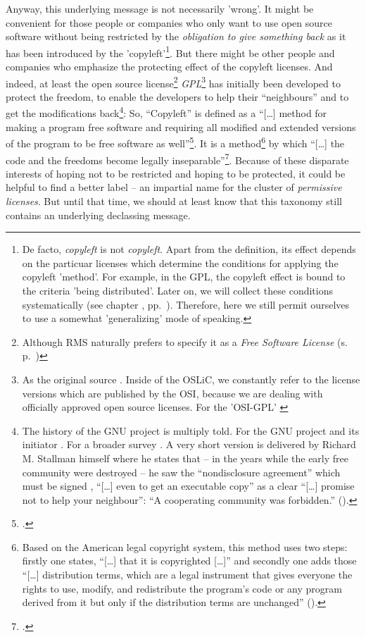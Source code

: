 Anyway, this underlying message is not necessarily 'wrong'. It might be
convenient for those people or companies who only want to use open source
software without being restricted by the \emph{obligation to give something
back} as it has been introduced by the 'copyleft'\footnote{De facto,
\emph{copyleft} is not \emph{copyleft}. Apart from the definition, its effect
depends on the par\-ti\-cu\-ar licenses which determine the conditions for
applying the copyleft 'method'. For example, in the GPL, the copyleft effect is
bound to the criteria 'being distributed'. Later on, we will collect these
conditions systematically (see chapter \emph{}, pp.\
\pageref{sec:OSUCdeduction}). Therefore, here we still permit ourselves to use a
somewhat 'generalizing' mode of speaking.}. But there might be other people and
companies who emphasize the protecting effect of the copyleft licenses. And
indeed, at least the open source license\footnote{Although RMS naturally prefers
to specify it as a \emph{Free Software License} (s. p.\ \pageref{RmsFsPriority})
} \emph{GPL}\footnote{As the original source \cite[cf.][\nopage
wp]{Gpl20FsfLicense1991a}. Inside of the OSLiC, we constantly refer to the
license versions which are published by the OSI, because we are dealing with
officially approved open source licenses. For the 'OSI-GPL' \cite[cf.][\nopage
wp]{Gpl20OsiLicense1991a}} has initially been developed to protect the freedom,
to enable the developers to help their \enquote{neighbours} and to get the
modifications back\footnote{The history of the GNU project is multiply told. For
the GNU project and its initiator \cite[cf.\ pars pro toto][\nopage
passim]{Williams2002a}. For a broader survey \cite[cf.\ pars pro toto][\nopage
passim]{Moody2001a}. A very short version is delivered by Richard M. Stallman
himself where he states that -- in the years while the early free community were
destroyed -- he saw the \enquote{nondisclosure agreement} which must be signed ,
\enquote{[\ldots] even to get an executable copy} as a clear \enquote{[\ldots]
promise not to help your neighbour}: \enquote{A cooperating community was
forbidden.} (\cite[cf.][16]{Stallman1999a}).}: So, \enquote{Copyleft} is defined
as a \enquote{[\ldots] method for making a program free software and requiring
all modified and extended versions of the program to be free software as
well}\footcite[cf.][89]{Stallman1996c}. It is a method\footnote{Based on the
American legal copyright system, this method uses two steps: firstly one states,
\enquote{[\ldots] that it is copyrighted [\ldots]} and secondly one adds those
\enquote{[\ldots] distribution terms, which are a legal instrument that gives
everyone the rights to use, modify, and redistribute the program's code or any
program derived from it but only if the distribution terms are unchanged}
(\cite[cf.][89]{Stallman1996c}).} by which \enquote{[\ldots] the code and the
freedoms become legally inseparable}\footcite[cf.][89]{Stallman1996c}. Because
of these disparate interests of hoping not to be restricted and hoping to be
protected, it could be helpful to find a better label -- an impartial name for
the cluster of \emph{permissive licenses}. But until that time, we should at
least know that this taxonomy still contains an underlying declassing message.

